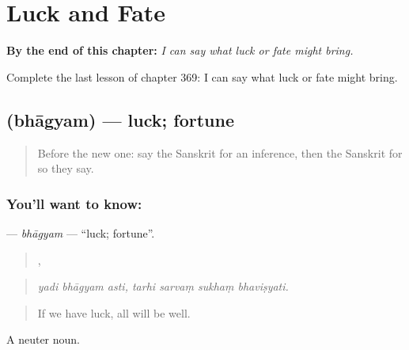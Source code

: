 
\chapter{Luck and Fate}
\label{ch:sa-luck-and-fate}

\begin{chapteropening}
\textbf{By the end of this chapter:} \emph{I can say what luck or fate might bring.}

Complete the last lesson of chapter 369: I can say what luck or fate might bring.
\end{chapteropening}

\section[\texorpdfstring{\sk{भाग्यम्} (bhāgyam)}{भाग्यम् (bhāgyam)}]{ (bhāgyam) — luck; fortune}

\label{lesson:SA-C369-bhagyam}



\begin{quote}
Before the new one: say the Sanskrit for an inference, then the Sanskrit for so they say.
\end{quote}

\subsection*{You'll want to know: }
\textbf{} — \emph{bhāgyam} — \textquotedblleft{}luck; fortune\textquotedblright{}.

\begin{quote}
  ,    
\end{quote}

\begin{quote}
\emph{yadi bhāgyam asti, tarhi sarvaṃ sukhaṃ bhaviṣyati.}
\end{quote}

\begin{quote}
If we have luck, all will be well.
\end{quote}

A neuter noun.

